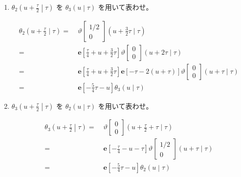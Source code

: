 \documentclass[12pt,b5paper]{ltjsarticle}
\begin{document}
\begin{enumerate}
\begin{enumerate}
\begin{enumerate}
                    \hrulefill

              \item $\displaystyle \theta_{2} \left(u+\frac{\tau}{2} \middle| \tau \right)$
                    を
                    $\displaystyle \theta_{3} \left(u \middle| \tau \right)$
                    を用いて表わせ。

                    \dotfill

                    \begin{align}
                     \theta_{2}(u+\frac{\tau}{2} \mid \tau)
                      =&\; \vartheta \begin{bmatrix} 1/2 \\ 0 \end{bmatrix} (u+\frac{3}{2}\tau \mid \tau)\\
                      =&\;
                     \mathbf{e}[\frac{\tau}{4} + u + \frac{3}{2}\tau]
                        \vartheta \begin{bmatrix} 0 \\ 0 \end{bmatrix} (u+2\tau \mid \tau)\\
                      =&\;
                     \mathbf{e}[\frac{\tau}{4} + u + \frac{3}{2}\tau]
                        \mathbf{e}[-\tau -2(u+\tau)]
                               \vartheta \begin{bmatrix} 0 \\ 0 \end{bmatrix} (u+\tau \mid \tau)\\
                      =&\;
                     \mathbf{e}[-\frac{5}{4}\tau-u] \theta_{3}(u\mid \tau)
                    \end{align}

                    \hrulefill

              \item $\displaystyle \theta_{3} \left(u+\frac{\tau}{2} \middle| \tau \right)$
                    を
                    $\displaystyle \theta_{2} \left(u \middle| \tau \right)$
                    を用いて表わせ。

                    \dotfill

                    \begin{align}
                     \theta_{3} \left(u+\frac{\tau}{2} \middle| \tau \right)
                     =&\;
                     \vartheta \begin{bmatrix} 0 \\ 0 \end{bmatrix} (u+\frac{\tau}{2}+\tau \mid \tau)\\
                     =&\; \mathbf{e}[-\frac{\tau}{4}-u-\tau]
                     \vartheta \begin{bmatrix} 1/2 \\ 0 \end{bmatrix} (u+\tau \mid \tau)\\
                     =&\; \mathbf{e}[-\frac{5}{4}\tau-u]
                     \theta_{2} \left(u \middle| \tau \right)
                    \end{align}


\end{enumerate}
\end{enumerate}
\end{enumerate}
\end{document}

